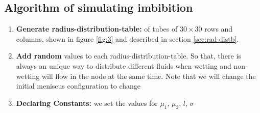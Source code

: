 \documentclass[
	12pt
] {article}
\begin{document}
	
\subsection{Algorithm of simulating imbibition}

\begin{enumerate}
	\item \textbf{Generate radius-distribution-table:} of tubes of $30 \times 30$ rows and columns, shown in figure \ref{fig:3} and described in section \ref{sec:rad-distb}.
	
	\item \textbf{Add random} values to each radius-distribution-table. So that, there is always an unique way to distribute different fluids when wetting and non-wetting will flow in the node at the same time. Note that we will change the initial meniscus configuration to change 
	
	\item \textbf{Declaring Constants:} we set the values for  ${\mu}_{1}$, ${\mu}_{2}$, $l$, $\sigma$
\end{enumerate}
\end{document}

